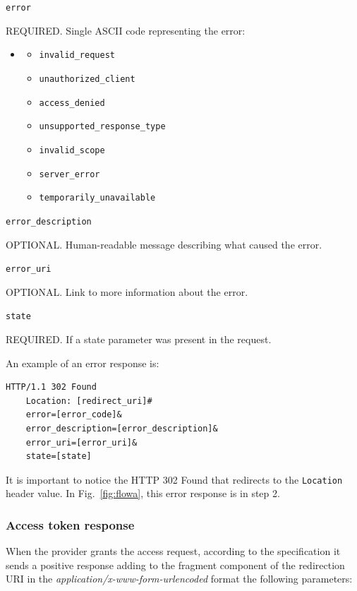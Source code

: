 \texttt{error}

\hspace{0.5cm}REQUIRED. Single ASCII code representing the error:

\begin{itemize}
\item[] \begin{itemize}
        \item \texttt{invalid\_request}
        \item \texttt{unauthorized\_client}
        \item \texttt{access\_denied}
        \item \texttt{unsupported\_response\_type}
        \item \texttt{invalid\_scope}
        \item \texttt{server\_error}
        \item \texttt{temporarily\_unavailable}
\end{itemize}
\end{itemize}

\texttt{error\_description}

\hspace{0.5cm}OPTIONAL. Human-readable message describing what caused the error.

\texttt{error\_uri}

\hspace{0.5cm}OPTIONAL. Link to more information about the error.

\texttt{state}

\hspace{0.5cm}REQUIRED. If a state parameter was present in the request.

\vspace{1cm}

\noindent An example of an error response is:

\begin{lstlisting}[basicstyle=\ttfamily]
  HTTP/1.1 302 Found
    Location: [redirect_uri]#
    error=[error_code]&
    error_description=[error_description]&
    error_uri=[error_uri]&
    state=[state]
\end{lstlisting}

\noindent It is important to notice the HTTP 302 Found that redirects to the \texttt{Location} header value. In Fig.~\ref{fig:flowa}, this error response is in step 2.

\subsubsection{Access token response}
When the provider grants the access request, according to the specification it sends a positive response adding to the fragment component of the redirection URI in the \textit{application/x-www-form-urlencoded} format the following parameters:

